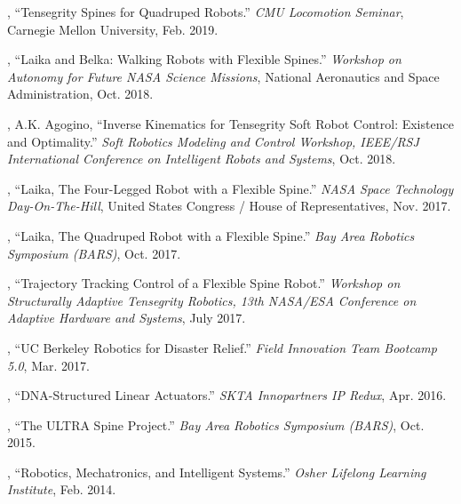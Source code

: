 \documentclass[letterpaper]{deedy-resume} %
\begin{document}
{\begin{etaremune}[itemsep=0.1cm]
\item \underline{{}}, ``Tensegrity Spines for Quadruped Robots.'' {\it CMU Locomotion Seminar}, Carnegie Mellon University, Feb. 2019.

\item \underline{{}}, ``Laika and Belka: Walking Robots with Flexible Spines.'' {\it Workshop on Autonomy for Future NASA Science Missions}, National Aeronautics and Space Administration, Oct. 2018.

\item \underline{{}}, A.K. Agogino, ``Inverse Kinematics for Tensegrity Soft Robot Control: Existence and Optimality.'' {\it Soft Robotics Modeling and Control Workshop, IEEE/RSJ International Conference on Intelligent Robots and Systems}, Oct. 2018.

\item \underline{{}}, ``Laika, The Four-Legged Robot with a Flexible Spine.'' {\it NASA Space Technology Day-On-The-Hill}, United States Congress / House of Representatives, Nov. 2017.

\item \underline{{}}, ``Laika, The Quadruped Robot with a Flexible Spine.'' {\it Bay Area Robotics Symposium (BARS)}, Oct. 2017.

\item \underline{{}}, ``Trajectory Tracking Control of a Flexible Spine Robot.'' {\it Workshop on Structurally Adaptive Tensegrity Robotics, 13th NASA/ESA Conference on Adaptive Hardware and Systems}, July 2017.

\item \underline{{}}, ``UC Berkeley Robotics for Disaster Relief.'' {\it Field Innovation Team Bootcamp 5.0}, Mar. 2017.

\item \underline{{}}, ``DNA-Structured Linear Actuators.'' {\it  SKTA Innopartners IP Redux}, Apr. 2016.

\item \underline{{}}, ``The ULTRA Spine Project.'' {\it Bay Area Robotics Symposium (BARS)}, Oct. 2015.

\item \underline{{}}, ``Robotics, Mechatronics, and Intelligent Systems.'' {\it Osher Lifelong Learning Institute}, Feb. 2014.


\end{etaremune}}
\end{document}
